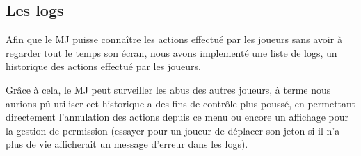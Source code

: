 \subsection{Les logs}

Afin que le MJ puisse connaître les actions effectué par les joueurs sans avoir à regarder tout le temps son écran, nous avons implementé une  liste de logs, un historique des actions effectué par les joueurs.

Grâce à cela, le MJ peut surveiller les abus des autres joueurs, à terme nous aurions pû utiliser cet historique a des fins de contrôle plus poussé, en permettant directement l'annulation des actions depuis ce menu ou encore un affichage pour la gestion de permission (essayer pour un joueur de déplacer son jeton si il n'a plus de vie afficherait un message d'erreur dans les logs).